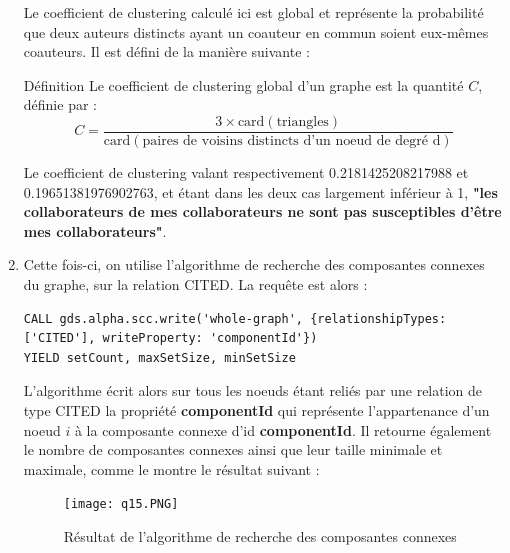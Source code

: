 \documentclass[11pt]{article}
\newcommand{\eb}{\end{bclogo}}
\newcounter{definition}
\newcommand{\bd}[1]{\addtocounter{definition}{1} \begin{bclogo}[logo=\bcinfo ,sousTitre=#1,nobreak=true]{Définition \thedefinition}}
\begin{document}
\begin{enumerate}[resume]
Le coefficient de clustering calculé ici est global et représente la probabilité que deux auteurs distincts ayant un coauteur en commun soient eux-mêmes coauteurs. Il est défini de la manière suivante :
\bd{Coefficient de clustering global}
Le coefficient de clustering global d'un graphe est la quantité $C$, définie par :
$$ C = \dfrac{3\times \text{card}(\text{triangles})}{\text{card}(\text{paires de voisins distincts d'un noeud de degré d})} $$
\eb
Le coefficient de clustering valant respectivement 0.2181425208217988 et 0.19651381976902763, et étant dans les deux cas largement inférieur à 1, \textbf{"les collaborateurs de mes collaborateurs ne sont pas susceptibles d'être mes collaborateurs"}.
\item 
Cette fois-ci, on utilise l'algorithme de recherche des composantes connexes du graphe, sur la relation CITED. La requête est alors :
\begin{lstlisting}
CALL gds.alpha.scc.write('whole-graph', {relationshipTypes: ['CITED'], writeProperty: 'componentId'})
YIELD setCount, maxSetSize, minSetSize
\end{lstlisting}
L'algorithme écrit alors sur tous les noeuds étant reliés par une relation de type CITED la propriété \textbf{componentId} qui représente l'appartenance d'un noeud $i$ à la composante connexe d'id \textbf{componentId}. Il retourne également le nombre de composantes connexes ainsi que leur taille minimale et maximale, comme le montre le résultat suivant :

\begin{figure}[H]
    \centerline{\texttt{[image: q15.PNG]}}
    \caption{Résultat de l'algorithme de recherche des composantes connexes}
\end{figure}


\end{enumerate}
\end{document}
